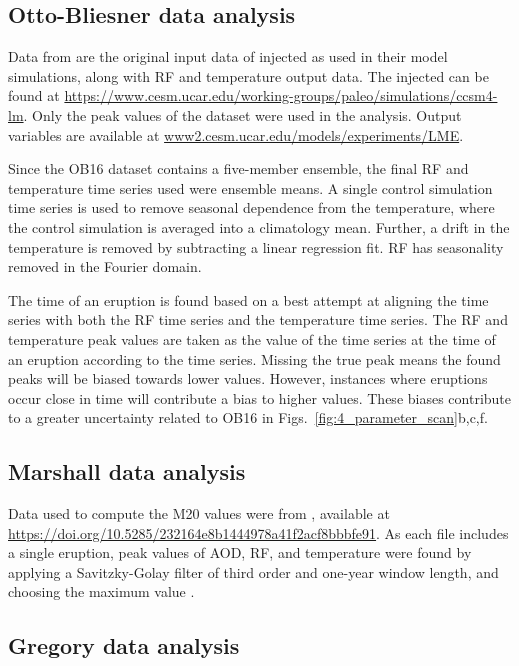\documentclass[draft]{agujournal2019}
\begin{document}
\subsection{Otto-Bliesner data analysis}\label{ap:ob16}

Data from  are the original input data of injected  as
used in their model simulations, along with RF and temperature output data. The injected
 can be found at
\url{https://www.cesm.ucar.edu/working-groups/paleo/simulations/ccsm4-lm}. Only the peak
values of the  dataset were used in the analysis. Output variables are available
at \url{www2.cesm.ucar.edu/models/experiments/LME}.

Since the OB16 dataset contains a five-member ensemble, the final RF and temperature
time series used were ensemble means. A single control simulation time series is used to
remove seasonal dependence from the temperature, where the control simulation is
averaged into a climatology mean. Further, a drift in the temperature is removed by
subtracting a linear regression fit. RF has seasonality removed in the Fourier domain.

The time of an eruption is found based on a best attempt at aligning the  time
series with both the RF time series and the temperature time series. The RF and
temperature peak values are taken as the value of the time series at the time of an
eruption according to the  time series. Missing the true peak means the found
peaks will be biased towards lower values. However, instances where eruptions occur
close in time will contribute a bias to higher values. These biases contribute to a
greater uncertainty related to OB16 in Figs.~\ref{fig:4_parameter_scan}b,c,f.

\subsection{Marshall data analysis}\label{ap:m20}

Data used to compute the M20 values were from , available at
\url{https://doi.org/10.5285/232164e8b1444978a41f2acf8bbbfe91}. As each file includes a
single eruption, peak values of AOD, RF, and temperature were found by applying a
Savitzky-Golay filter of third order and one-year window length, and choosing the
maximum value \cite{savitzky1964}.

\subsection{Gregory data analysis}\label{ap:g16}
\end{document}

